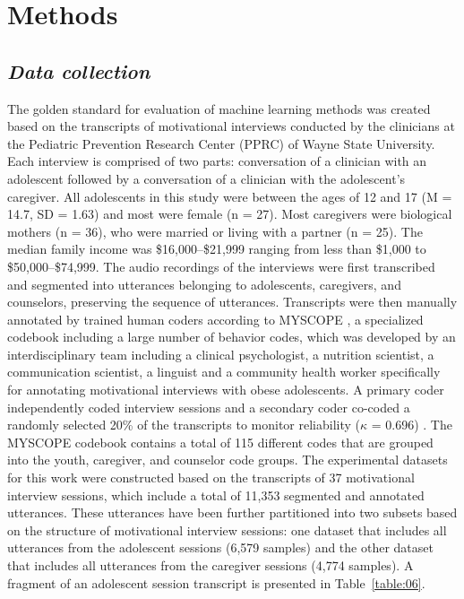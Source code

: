 \documentclass{amia}
\begin{document}
\section*{Methods}
\subsection*{\textit{Data collection}}
The golden standard for evaluation of machine learning methods was created based on the transcripts of motivational interviews conducted by the clinicians at the Pediatric
Prevention Research Center (PPRC) of Wayne State University. Each interview is comprised of two parts: conversation of a clinician with an adolescent followed by a conversation of
a clinician with the adolescent's caregiver. All adolescents in this study were between the ages of 12 and 17 (M = 14.7, SD = 1.63) and most were female (n = 27). Most caregivers
were biological mothers (n = 36), who were married or living with a partner (n = 25). The median family income was \$16,000--\$21,999 ranging from less than \$1,000 to
\$50,000--\$74,999. The audio recordings of the interviews were first transcribed and segmented into utterances belonging to adolescents, caregivers, and counselors, preserving the
sequence of utterances. Transcripts were then manually annotated by trained human coders according to MYSCOPE \citep{07}, a specialized codebook including a large number of
behavior codes, which was developed by an interdisciplinary team including a clinical psychologist, a nutrition scientist, a communication scientist, a linguist and a community
health worker specifically for annotating motivational interviews with obese adolescents. A primary coder independently coded interview sessions and a secondary coder co-coded a
randomly selected 20\% of the transcripts to monitor reliability ($\kappa$ = 0.696) \citep{07}. The MYSCOPE codebook contains a total of 115 different codes that are grouped into
the youth, caregiver, and counselor code groups. The experimental datasets for this work were constructed based on the transcripts of 37 motivational interview sessions, which
include a total of 11,353 segmented and annotated utterances. These utterances have been further partitioned into two subsets based on the structure of motivational interview
sessions: one dataset that includes all utterances from the adolescent sessions (6,579 samples) and the other dataset that includes all utterances from the caregiver sessions
(4,774 samples). A fragment of an adolescent session transcript is presented in Table~\ref{table:06}.
\end{document}
